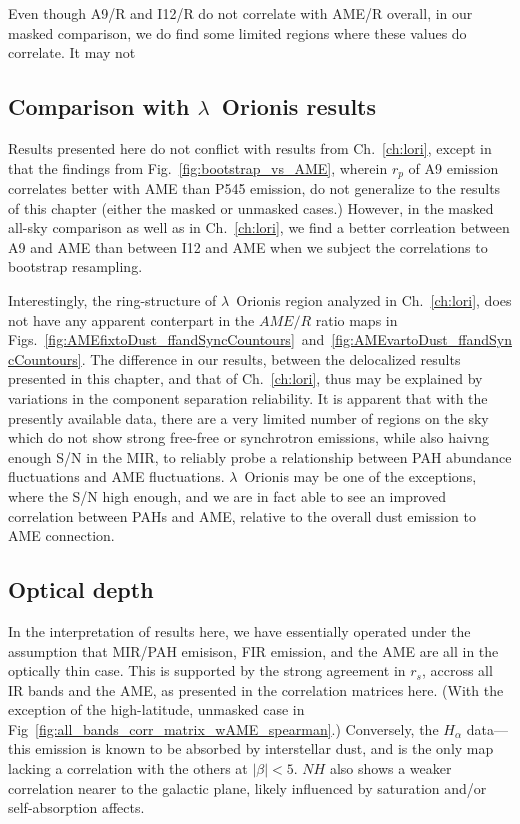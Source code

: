              Even though A9/R and I12/R do not correlate with AME/R overall, in our masked comparison, we do find some limited regions where these values do correlate. It may not

            \subsection{Comparison with $\lambda$~Orionis results}
                Results presented here do not conflict with results from Ch.~\ref{ch:lori}, except in that the findings from Fig.~\ref{fig:bootstrap_vs_AME}, wherein $r_{p}$ of A9 emission correlates better with AME than P545 emission, do not generalize to the results of this chapter (either the masked or unmasked cases.) However, in the masked all-sky comparison as well as in Ch.~\ref{ch:lori}, we find a better corrleation between A9 and AME than between I12 and AME when we subject the correlations to bootstrap resampling.

                Interestingly, the ring-structure of $\lambda$~Orionis region analyzed in Ch.~\ref{ch:lori}, does not have any apparent conterpart in the $AME/R$ ratio maps in Figs.~\ref{fig:AMEfixtoDust_ffandSyncCountours}~and~\ref{fig:AMEvartoDust_ffandSyncCountours}. The difference in our results, between the delocalized results presented in this chapter, and that of Ch.~\ref{ch:lori}, thus may be explained by variations in the component separation reliability. It is apparent that with the presently available data, there are a very limited number of regions on the sky which do not show strong free-free or synchrotron emissions, while also haivng enough S/N in the MIR, to reliably probe a relationship between PAH abundance fluctuations and AME fluctuations. $\lambda$~Orionis may be one of the exceptions, where the S/N high enough, and we are in fact able to see an improved correlation between PAHs and AME, relative to the overall dust emission to AME connection.
            \subsection{Optical depth}
              In the interpretation of results here, we have essentially operated under the assumption that MIR/PAH emisison, FIR emission, and the AME are all in the optically thin case. This is supported by the strong agreement in $r_{s}$, accross all IR bands and the AME, as presented in the correlation matrices here. (With the exception of the high-latitude, unmasked case in Fig~\ref{fig:all_bands_corr_matrix_wAME_spearman}.) Conversely, the $H_{\alpha}$ data--- this emission is known to be absorbed by interstellar dust, and is the only map lacking a correlation with the others at $|\beta{}|<5$. $N{H}$ also shows a weaker correlation nearer to the galactic plane, likely influenced by saturation and/or self-absorption affects.


